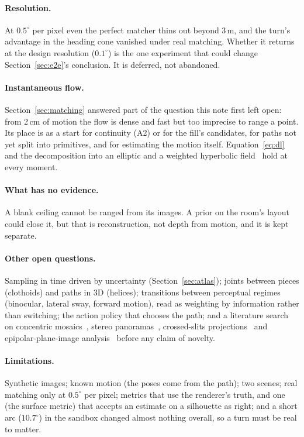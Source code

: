 \documentclass[11pt,a4paper]{article}
\begin{document}
\paragraph{Resolution.} At $0.5^\circ$ per pixel even the perfect matcher thins out beyond 3\,m, and the turn's advantage
in the heading cone vanished under real matching. Whether it returns at the design resolution ($0.1^\circ$) is the one
experiment that could change Section~\ref{sec:e2e}'s conclusion. It is deferred, not abandoned.

\paragraph{Instantaneous flow.} Section~\ref{sec:matching} answered part of the question this note first left open: from
2\,cm of motion the flow is dense and fast but too imprecise to range a point. Its place is as a start for continuity (A2)
or for the fill's candidates, for paths not yet split into primitives, and for estimating the motion itself. Equation~\eqref{eq:dl}
and the decomposition into an elliptic and a weighted hyperbolic field~\cite{longuethiggins} hold at every moment.

\paragraph{What has no evidence.} A blank ceiling cannot be ranged from its images. A prior on the room's layout could
close it, but that is reconstruction, not depth from motion, and it is kept separate.

\paragraph{Other open questions.} Sampling in time driven by uncertainty (Section~\ref{sec:atlas}); joints between pieces
(clothoids) and paths in 3D (helices); transitions between perceptual regimes (binocular, lateral sway, forward motion),
read as weighting by information rather than switching; the action policy that chooses the path; and a literature search on
concentric mosaics~\cite{shum}, stereo panoramas~\cite{peleg}, crossed-slits projections~\cite{zomet} and
epipolar-plane-image analysis~\cite{bolles} before any claim of novelty.

\paragraph{Limitations.} Synthetic images; known motion (the poses come from the path); two scenes; real matching only at
$0.5^\circ$ per pixel; metrics that use the renderer's truth, and one (the surface metric) that accepts an estimate on a
silhouette as right; and a short arc ($10.7^\circ$) in the sandbox changed almost nothing overall, so a turn must be real
to matter.
\end{document}
